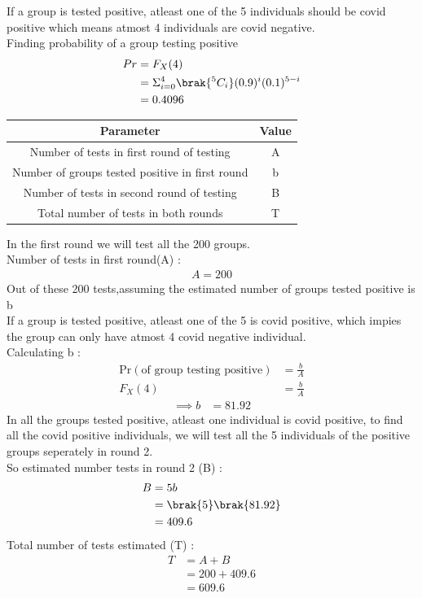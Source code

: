 \documentclass[journal,12pt,onecolumn]{IEEEtran}
\begin{document}
If a group is tested positive, atleast one of the 5 individuals should be covid positive which means atmost 4 individuals are covid negative. \\
Finding probability of a group testing positive
\begin{align}
Pr &= F_{X}(4) \\ 
&= \Sigma_{i=0}^4 \brak{^{5}C_{i}}(0.9)^{i}(0.1)^{5-i} \\
 &= 0.4096
\end{align}
\begin{table}[H]
\def\arraystretch{1.2}
\begin{tabular}{|c|c|}
\hline
	\textbf{Parameter} &\textbf{Value} \\ \hline

	Number of tests in first round of testing &A \\ 
	\hline
	Number of groups tested positive in first round &b \\ 
	\hline
	Number of tests in second round of testing &B \\ 
	\hline
	Total number of tests in both rounds &T\\ \hline
	
	
\end{tabular}
\end{table}
In the first round we will test all the 200 groups. \\
Number of tests in first round(A) :
\begin{align*}
A = 200
\end{align*}
Out of these 200 tests,assuming the estimated number of groups tested positive is b \\
If a group is tested positive, atleast one of the 5 is covid positive, which impies the group can only have atmost 4 covid negative individual. \\
Calculating b :
\begin{align}
 \text{Pr}(\text{of group testing positive}) &= \frac{b}{A} \\
 F_{X}(4) &= \frac{b}{A}
 \end{align}
 \begin{align}
 \implies b &= 81.92
\end{align}
In all the groups tested positive, atleast one individual is covid positive, to find all the covid positive individuals, we will test all the 5 individuals of the positive groups seperately in round 2. \\
So estimated number tests in round 2 (B) :
\begin{align}
B &= 5b \\ &= \brak{5}\brak{81.92} \\ &= 409.6
\end{align}
Total number of tests estimated (T) :
\begin{align}
T &= A + B \\ &= 200 + 409.6 \\ &= 609.6
\end{align}
\end{document}

